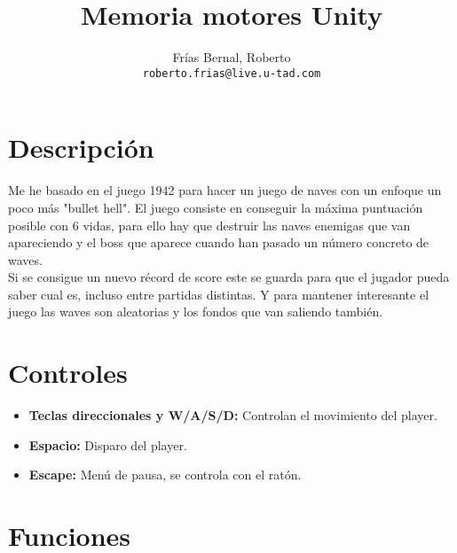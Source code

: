 \documentclass[titlepage, 4apaper]{article}
\title{Memoria motores Unity}
\author{Frías Bernal, Roberto\\
\texttt{roberto.frias@live.u-tad.com}}
\begin{document}
\maketitle
\tableofcontents
\clearpage

\section{Descripción}

Me he basado en el juego 1942 para hacer un juego de naves con un enfoque un poco más "bullet hell". El juego consiste en conseguir la máxima puntuación posible con 6 vidas, para ello hay que destruir las naves enemigas que van apareciendo y el boss que aparece cuando han pasado un número concreto de waves.\\Si se consigue un nuevo récord de score este se guarda para que el jugador pueda saber cual es, incluso entre partidas distintas. Y para mantener interesante el juego las waves son aleatorias y los fondos que van saliendo también.

\section{Controles}

\begin{itemize}
	\item \textbf{Teclas direccionales y W/A/S/D:} Controlan el movimiento del player.
  \item \textbf{Espacio:} Disparo del player.
  \item \textbf{Escape:} Menú de pausa, se controla con el ratón.
\end{itemize}

\section{Funciones}
\end{document}
